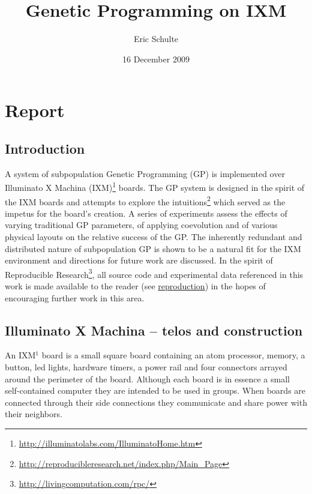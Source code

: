 \documentclass[11pt]{article}
\title{Genetic Programming on IXM}
\author{Eric Schulte}
\date{16 December 2009}
\begin{document}
\maketitle



\section*{Report}
\label{sec-1}

\subsection*{Introduction}
\label{sec-1.1}

A system of subpopulation Genetic Programming (GP) is implemented over
Illuminato X Machina (IXM)\footnote{\href{http://illuminatolabs.com/IlluminatoHome.htm}{http://illuminatolabs.com/IlluminatoHome.htm} } boards.  The GP system is designed in
the spirit of the IXM boards and attempts to explore the
intuitions\footnote{\href{http://reproducibleresearch.net/index.php/Main_Page}{http://reproducibleresearch.net/index.php/Main\_Page} } which served as the impetus for the board's creation.
A series of experiments assess the effects of varying traditional GP
parameters, of applying coevolution and of various physical layouts on
the relative success of the GP.  The inherently redundant and
distributed nature of subpopulation GP is shown to be a natural fit
for the IXM environment and directions for future work are discussed.
In the spirit of Reproducible Research\footnote{\href{http://livingcomputation.com/rpc/}{http://livingcomputation.com/rpc/} }, all source code and
experimental data referenced in this work is made available to the
reader (see \hyperref[sec-1.8]{reproduction}) in the hopes of encouraging further work in
this area.

\subsection*{Illuminato X Machina -- telos and construction}
\label{sec-1.2}

An IXM$^{1}$ board is a small square board containing an atom
processor, memory, a button, led lights, hardware timers, a power rail
and four connectors arrayed around the perimeter of the board.
Although each board is in essence a small self-contained computer they
are intended to be used in groups.  When boards are connected through
their side connections they communicate and share power with their
neighbors.
\end{document}
